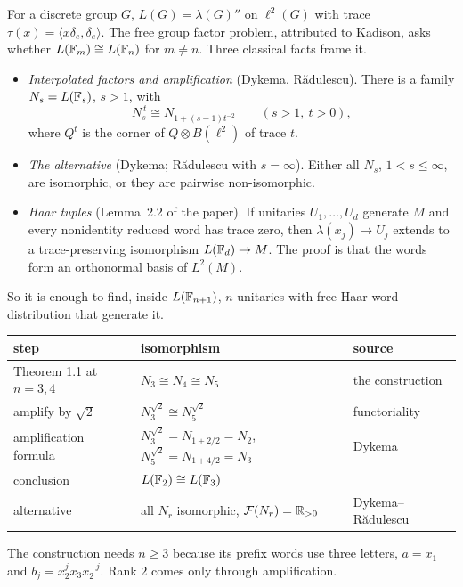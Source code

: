 \label{sec:statement}
For a discrete group $G$, $L(G)=\lambda(G)''$ on $\ell^2(G)$ with trace $\tau(x)=\langle x\delta_e,\delta_e\rangle$. The free group factor problem, attributed to Kadison, asks
whether $L(\mathbb F_m)\cong L(\mathbb F_n)$ for $m\ne n$. Three classical facts frame it.
\begin{itemize}[leftmargin=*]
\item \emph{Interpolated factors and amplification} (Dykema, Rădulescu). There is a family $N_s=L(\mathbb F_s)$, $s>1$, with
\[
N_s^{\,t}\cong N_{1+(s-1)t^{-2}}\qquad(s>1,\ t>0),
\]
where $Q^t$ is the corner of $Q\otimes B(\ell^2)$ of trace $t$.
\item \emph{The alternative} (Dykema; Rădulescu with $s=\infty$). Either all $N_s$, $1<s\le\infty$, are isomorphic, or they are pairwise
non-isomorphic.
\item \emph{Haar tuples} (Lemma~2.2 of the paper). If unitaries $U_1,\dots,U_d$ generate $M$ and every nonidentity reduced word has trace zero, then
$\lambda(x_j)\mapsto U_j$ extends to a trace-preserving isomorphism $L(\mathbb F_d)\to M$. The proof is that the words form an orthonormal basis of $L^2(M)$.
\end{itemize}
So it is enough to find, inside $L(\mathbb F_{n+1})$, $n$ unitaries with free Haar word distribution that generate it.
\begin{center}
\begin{tabular}{lll}\toprule
step & isomorphism & source\\\midrule
Theorem 1.1 at $n=3,4$ & $N_3\cong N_4\cong N_5$ & the construction\\
amplify by $\sqrt2$ & $N_3^{\sqrt2}\cong N_5^{\sqrt2}$ & functoriality\\
amplification formula & $N_3^{\sqrt2}=N_{1+2/2}=N_2$, $N_5^{\sqrt2}=N_{1+4/2}=N_3$ & Dykema\\
conclusion & $L(\mathbb F_2)\cong L(\mathbb F_3)$ & \\
alternative & all $N_r$ isomorphic, $\mathcal F(N_r)=\mathbb R_{>0}$ & Dykema--Rădulescu\\\bottomrule
\end{tabular}
\end{center}
The construction needs $n\ge3$ because its prefix words use three letters, $a=x_1$ and $b_j=x_2^jx_3x_2^{-j}$. Rank $2$ comes only through amplification.
